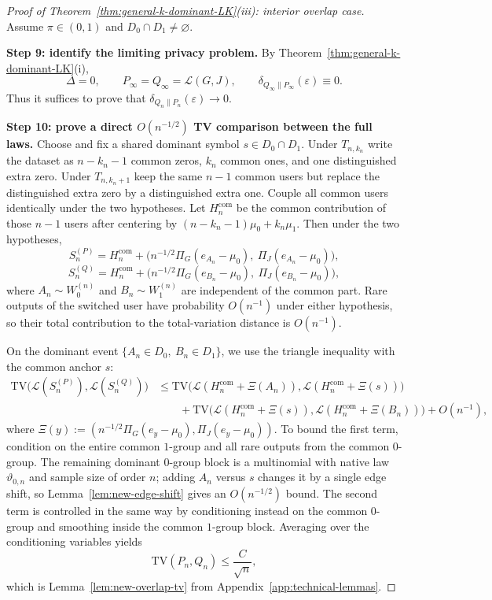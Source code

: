 \documentclass{article}
\newcommand{\TV}{\mathrm{TV}}
\newcommand{\1}{\mathbf 1}
\begin{document}
\begin{proof}[Proof of Theorem~\ref{thm:general-k-dominant-LK}(iii): interior overlap case]
Assume $\pi\in(0,1)$ and $D_0\cap D_1\neq\varnothing$.

\textbf{Step 9: identify the limiting privacy problem.}
By Theorem~\ref{thm:general-k-dominant-LK}(i),
\[
\Delta=0,
\qquad
P_\infty=Q_\infty=\mathcal L(G,J),
\qquad
\delta_{Q_\infty\|P_\infty}(\varepsilon)\equiv 0.
\]
Thus it suffices to prove that $\delta_{Q_n\|P_n}(\varepsilon)\to 0$.

\medskip
\textbf{Step 10: prove a direct $O(n^{-1/2})$ TV comparison between the full laws.}
Choose and fix a shared dominant symbol $s\in D_0\cap D_1$. Under $T_{n,k_n}$ write the dataset as
$n-k_n-1$ common zeros, $k_n$ common ones, and one distinguished extra zero. Under $T_{n,k_n+1}$ keep the same
$n-1$ common users but replace the distinguished extra zero by a distinguished extra one. Couple all common users
identically under the two hypotheses. Let $H_n^{\mathrm{com}}$ be the common contribution of those $n-1$ users after centering
by $(n-k_n-1)\mu_0+k_n\mu_1$. Then under the two hypotheses,
\[
S_n^{(P)}=H_n^{\mathrm{com}}+\bigl(n^{-1/2}\Pi_G(e_{A_n}-\mu_0),\ \Pi_J(e_{A_n}-\mu_0)\bigr),
\]
\[
S_n^{(Q)}=H_n^{\mathrm{com}}+\bigl(n^{-1/2}\Pi_G(e_{B_n}-\mu_0),\ \Pi_J(e_{B_n}-\mu_0)\bigr),
\]
where $A_n\sim W_0^{(n)}$ and $B_n\sim W_1^{(n)}$ are independent of the common part. Rare outputs of the switched
user have probability $O(n^{-1})$ under either hypothesis, so their total contribution to the total-variation
distance is $O(n^{-1})$.

On the dominant event $\{A_n\in D_0,\ B_n\in D_1\}$, we use the triangle inequality with the common anchor $s$:
\begin{align*}
\TV\bigl(\mathcal L(S_n^{(P)}),\mathcal L(S_n^{(Q)})\bigr)
&\le
\TV\bigl(\mathcal L(H_n^{\mathrm{com}}+\Xi(A_n)),\mathcal L(H_n^{\mathrm{com}}+\Xi(s))\bigr) \\
&\qquad+
\TV\bigl(\mathcal L(H_n^{\mathrm{com}}+\Xi(s)),\mathcal L(H_n^{\mathrm{com}}+\Xi(B_n))\bigr)
+O(n^{-1}),
\end{align*}
where $\Xi(y):=(n^{-1/2}\Pi_G(e_y-\mu_0),\Pi_J(e_y-\mu_0))$. To bound the first term, condition on the entire common
$1$-group and all rare outputs from the common $0$-group. The remaining dominant $0$-group block is a multinomial
with native law $\vartheta_{0,n}$ and sample size of order $n$; adding $A_n$ versus $s$ changes it by a single edge
shift, so Lemma~\ref{lem:new-edge-shift} gives an $O(n^{-1/2})$ bound. The second term is controlled in the same way
by conditioning instead on the common $0$-group and smoothing inside the common $1$-group block. Averaging over the
conditioning variables yields
\[
\TV(P_n,Q_n)\le \frac{C}{\sqrt n},
\]
which is Lemma~\ref{lem:new-overlap-tv} from Appendix~\ref{app:technical-lemmas}.


\end{proof}
\end{document}
